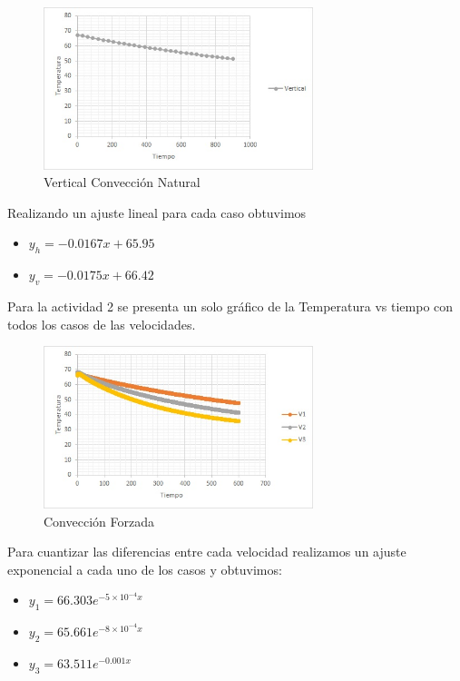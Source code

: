 \documentclass[12pt]{article}
\begin{document}
\begin{figure}[H]
\begin{center}
\includegraphics[width=0.7\textwidth]{vertical.jpg}  
\caption{Vertical Convección Natural}
\label{uno}
\end{center}
\end{figure}

Realizando un ajuste lineal para cada caso obtuvimos

\begin{itemize}
\item $y_h = -0.0167x +65.95$
\item $y_v = -0.0175x +66.42$
\end{itemize}

\pagebreak

Para la actividad 2 se presenta un solo gráfico de la Temperatura vs tiempo con todos los casos de las velocidades.

\begin{figure}[H]
\begin{center}
\includegraphics[width=0.7\textwidth]{34.jpg}  
\caption{Convección Forzada}
\label{uno}
\end{center}
\end{figure}

Para cuantizar las diferencias entre cada velocidad realizamos un ajuste exponencial a cada uno de los casos y obtuvimos:

\begin{itemize}
\item $y_1 = 66.303 e^{-5 \times 10^{-4} x}$
\item $y_2 = 65.661 e^{-8 \times 10^{-4} x}$
\item $y_3 = 63.511 e^{-0.001 x}$
\end{itemize}
\end{document}
